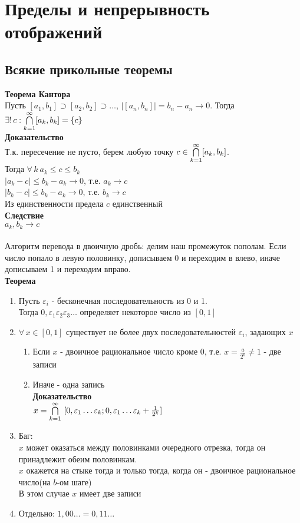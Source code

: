 \documentclass[12pt]{article}
\begin{document}
\section{Пределы и непрерывность отображений}
\subsection{Всякие прикольные теоремы}
\textbf{Теорема Кантора}\\
Пусть $[a_1, b_1] \supset [a_2, b_2] \supset \ldots$, $|[a_n,b_n]| = b_n-a_n \rightarrow 0$. Тогда $\exists!\, c: \bigcap\limits_{k=1}^\infty [a_k,b_k] = \{c\}$\\
\textbf{Доказательство}\\
Т.к. пересечение не пусто, берем любую точку $c \in \bigcap\limits_{k=1}^\infty [a_k,b_k]$.\\
Тогда $\forall\,k\ a_k\leq c \leq b_k$\\
$|a_k-c|\leq b_k-a_k \rightarrow 0$, т.е. $a_k\rightarrow c$\\
$|b_k-c|\leq b_k-a_k \rightarrow 0$, т.е. $b_k\rightarrow c$\\
Из единственности предела $c$ единственный\\
\textbf{Следствие}\\
$a_k, b_k \rightarrow c$\\\\
Алгоритм перевода в двоичную дробь: делим наш промежуток пополам. Если число попало в левую половинку, дописываем 0 и переходим в влево, иначе дописываем 1 и переходим вправо.\\
\textbf{Теорема}
\begin{enumerate}
    \item Пусть $\varepsilon_i$ - бесконечная последовательность из 0 и 1.\\
    Тогда $0,\varepsilon_1\varepsilon_2\varepsilon_3\ldots$ определяет некоторое число из $[0,1]$
    \item $\forall\,x\in [0,1]$ существует не более двух последовательностей $\varepsilon_i$, задающих $x$
    \begin{enumerate}
        \item Если $x$ - двоичное рациональное число кроме 0, т.е. $x = \frac a{2^b} \neq 1$ - две записи
        \item Иначе - одна запись\\
        \textbf{Доказательство}\\
    $x = \bigcapl_{k=1}^\infty\ [0,\varepsilon_1\ldots\varepsilon_k; 0,\varepsilon_1\ldots\varepsilon_k+\frac{1}{2^k}]$
    \end{enumerate}
    \item Баг:\\
    $x$ может оказаться между половинками очередного отрезка, тогда он принадлежит обеим половинкам.\\
    $x$ окажется на стыке тогда и только тогда, когда он - двоичное рациональное число(на $b$-ом шаге)\\
    В этом случае $x$ имеет две записи
    \item Отдельно:
    $1,00\ldots = 0,11\ldots$
\end{enumerate}
\end{document}
